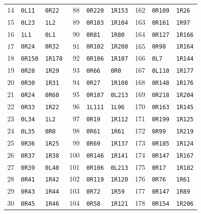 \begin{longtable}{@{}rll@{\hspace{1.2em}}rll@{\hspace{1.2em}}rll@{}}
14 & \texttt{0L11} & \texttt{0R22} & 88 & \texttt{0R220} & \texttt{1R153} & 162 & \texttt{0R109} & \texttt{1R26}\\
15 & \texttt{0L23} & \texttt{1L2} & 89 & \texttt{0R103} & \texttt{1R104} & 163 & \texttt{0R161} & \texttt{1R97}\\
16 & \texttt{1L1} & \texttt{0L1} & 90 & \texttt{0R81} & \texttt{1R80} & 164 & \texttt{0R127} & \texttt{1R166}\\
17 & \texttt{0R24} & \texttt{0R32} & 91 & \texttt{0R102} & \texttt{1R200} & 165 & \texttt{0R98} & \texttt{1R164}\\
18 & \texttt{0R150} & \texttt{1R178} & 92 & \texttt{0R106} & \texttt{1R107} & 166 & \texttt{0L7} & \texttt{1R144}\\
19 & \texttt{0R28} & \texttt{1R29} & 93 & \texttt{0R66} & \texttt{0R0} & 167 & \texttt{0L110} & \texttt{1R177}\\
20 & \texttt{0R30} & \texttt{1R31} & 94 & \texttt{0R27} & \texttt{1R108} & 168 & \texttt{0R148} & \texttt{1R176}\\
21 & \texttt{0R24} & \texttt{0R60} & 95 & \texttt{0R187} & \texttt{0L213} & 169 & \texttt{0R218} & \texttt{1R204}\\
22 & \texttt{0R33} & \texttt{1R22} & 96 & \texttt{1L111} & \texttt{1L96} & 170 & \texttt{0R163} & \texttt{1R145}\\
23 & \texttt{0L34} & \texttt{1L2} & 97 & \texttt{0R19} & \texttt{1R112} & 171 & \texttt{0R199} & \texttt{1R125}\\
24 & \texttt{0L35} & \texttt{0R0} & 98 & \texttt{0R61} & \texttt{1R61} & 172 & \texttt{0R99} & \texttt{1R219}\\
25 & \texttt{0R36} & \texttt{1R25} & 99 & \texttt{0R69} & \texttt{1R137} & 173 & \texttt{0R185} & \texttt{1R124}\\
26 & \texttt{0R37} & \texttt{1R38} & 100 & \texttt{0R146} & \texttt{1R141} & 174 & \texttt{0R147} & \texttt{1R167}\\
27 & \texttt{0R39} & \texttt{0L40} & 101 & \texttt{0R106} & \texttt{0L213} & 175 & \texttt{0R17} & \texttt{1R182}\\
28 & \texttt{0R41} & \texttt{1R42} & 102 & \texttt{0R119} & \texttt{1R120} & 176 & \texttt{0R76} & \texttt{1R61}\\
29 & \texttt{0R43} & \texttt{1R44} & 103 & \texttt{0R72} & \texttt{1R59} & 177 & \texttt{0R147} & \texttt{1R89}\\
30 & \texttt{0R45} & \texttt{1R46} & 104 & \texttt{0R58} & \texttt{1R121} & 178 & \texttt{0R154} & \texttt{1R206}\\

\end{longtable}
